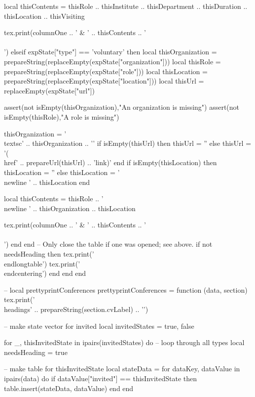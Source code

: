 \documentclass[letterpaper, 10pt]{article}
\newcommand{\headings}[1]{\section*{#1} \hrule \vspace{10pt}}
\begin{document}
\begin{luacode}
					local thisContents = thisRole ..
										thisInstitute .. thisDepartment .. thisDuration ..
										thisLocation ..
										thisVisiting

					tex.print(columnOne .. ' & ' .. thisContents .. ' \\\\')
				elseif expState["type"] == 'voluntary' then
					local thisOrganization 	= prepareString(replaceEmpty(expState["organization"]))
					local thisRole  		= prepareString(replaceEmpty(expState["role"]))
					local thisLocation      = prepareString(replaceEmpty(expState["location"]))
					local thisUrl 			= replaceEmpty(expState["url"])

					assert(not isEmpty(thisOrganization),"An organization is missing")
					assert(not isEmpty(thisRole),"A role is missing")

					thisOrganization = '\\textsc{' .. thisOrganization .. '}'
					if isEmpty(thisUrl) then
						thisUrl = ''
					else
						thisUrl = '(\\href{' .. prepareUrl(thisUrl) .. '}{link})'
					end
					if isEmpty(thisLocation) then
						thisLocation = ''
					else
						thisLocation = '\\newline ' .. thisLocation
					end

					local thisContents = thisRole ..
										'\\newline ' .. thisOrganization ..
										thisLocation

					tex.print(columnOne .. ' & ' .. thisContents .. '\\\\')
				end
			end
			-- Only close the table if one was opened; see above.
			if not needsHeading then
				tex.print('\\end{longtable}')
				tex.print('\\end{centering}')
			end
		end
	end

	-- local prettyprintConferences
	prettyprintConferences = function (data, section)
		tex.print('\\headings{' .. prepareString(section.cvLabel) .. '}')

		-- make state vector for invited
		local invitedStates = {true, false}

		for _, thisInvitedState in ipairs(invitedStates) do 											-- loop through all types
			local needsHeading = true

			-- make table for thisInvitedState
			local stateData = {}
			for dataKey, dataValue in ipairs(data) do
				if dataValue["invited"] == thisInvitedState then
					table.insert(stateData, dataValue)
				end
			end


\end{luacode}
\end{document}
